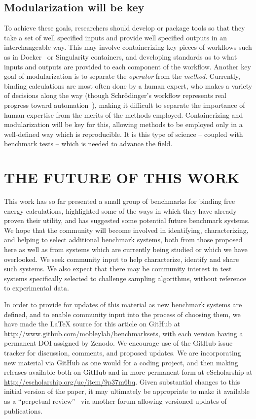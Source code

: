 \documentclass[aps,pre,twocolumn,nofootinbib,superscriptaddress,10pt, final,tightenlines]{revtex4-1}
\newcounter{comment}
\begin{document}
\subsection{Modularization will be key}
To achieve these goals, researchers should develop or package tools so that they take a set of well specified inputs and provide well specified outputs in an interchangeable way. 
This may involve containerizing key pieces of workflows such as in Docker~\cite{docker_what_2015} or Singularity \cite{Kurtzer:2016:singularity} containers,
 and developing standards as to what inputs and outputs are provided to each component of the workflow. 
Another key goal of modularization is to separate the \emph{operator} from the \emph{method}. 
Currently, binding calculations are most often done by a human expert, who makes a variety of decisions along the way (though Schr\"odinger's workflow represents real progress toward automation~\cite{schrodinger_accurate_2015}), making it difficult to separate the importance of human expertise from the merits of the methods employed. 
Containerizing and modularization will be key for this, allowing methods to be employed only in a well-defined way which is reproducible. It is this type of science -- coupled with benchmark tests -- which is needed to advance the field.


\section{THE FUTURE OF THIS WORK}
\label{sec:updates}
This work has so far presented a small group of benchmarks for binding free energy calculations, highlighted some of the ways in which they have already proven their utility, and has suggested some potential future benchmark systems. 
We hope that the community will become involved in identifying, characterizing, and helping to select additional benchmark systems, both from those proposed here as well as from systems which are currently being studied or which we have overlooked.
We seek community input to help characterize, identify and share such systems. 
We also expect that there may be community interest in test systems specifically selected to challenge sampling algorithms, without reference to experimental data.

In order to provide for updates of this material as new benchmark systems are defined, and to enable community input into the process of choosing them, we have made the LaTeX source for this article on GitHub at \url{http://www.github.com/mobleylab/benchmarksets}, with each version having a permanent DOI assigned by Zenodo. 
We encourage use of the GitHub issue tracker for discussion, comments, and proposed updates. 
We are incorporating new material via GitHub as one would for a coding project, and then making releases available both on GitHub and in more permanent form at eScholarship at \url{http://escholarship.org/uc/item/9p37m6bq}.
Given substantial changes to this initial version of the paper, it may ultimately be appropriate to make it available as a ``perpetual review''~\cite{mobley_proposal_2015} via another forum allowing versioned updates of publications. 
\end{document}
